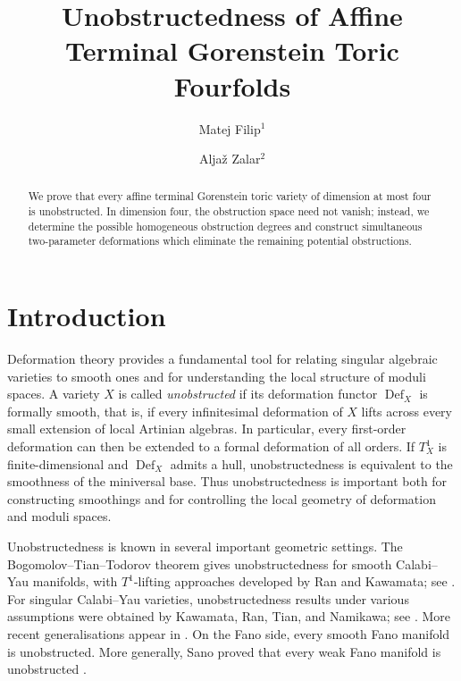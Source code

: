 \documentclass[11pt]{amsart}
\title{Unobstructedness of Affine Terminal Gorenstein Toric Fourfolds}
\author{Matej Filip${}^1$}
\author{Alja\v{z} Zalar${}^2$}
\numberwithin{equation}{section}
\theoremstyle{plain}
\theoremstyle{definition}
\newcommand{\0}{$0$-mutable}
\renewcommand{\1}{$1$-rigid}
\renewcommand{\0}{$0$-mutable}
\newcommand{\Def}{\operatorname{Def}}
\begin{document}
\begin{abstract}
We prove that every affine terminal Gorenstein toric variety of
dimension at most four is unobstructed. In dimension four, the
obstruction space need not vanish; instead, we determine the possible
homogeneous obstruction degrees and construct simultaneous
two-parameter deformations which eliminate the remaining potential
obstructions.
\end{abstract}

\maketitle





\section{Introduction}


Deformation theory provides a fundamental tool for relating singular
algebraic varieties to smooth ones and for understanding the local
structure of moduli spaces. A variety \(X\) is called
\emph{unobstructed} if its deformation functor \(\Def_X\) is formally
smooth, that is, if every infinitesimal deformation of \(X\) lifts
across every small extension of local Artinian algebras. In
particular, every first-order deformation can then be extended to a
formal deformation of all orders. If \(T_X^1\) is finite-dimensional
and \(\Def_X\) admits a hull, unobstructedness is equivalent to the
smoothness of the miniversal base. Thus unobstructedness is important
both for constructing smoothings and for controlling the local
geometry of deformation and moduli spaces.

Unobstructedness is known in several important geometric settings.
The Bogomolov--Tian--Todorov theorem gives unobstructedness for smooth
Calabi--Yau manifolds, with \(T^1\)-lifting approaches developed by
Ran and Kawamata; see \cite{Ran92b,Kaw92}. For singular Calabi--Yau
varieties, unobstructedness results under various assumptions were
obtained by Kawamata, Ran, Tian, and Namikawa; see
\cite{Kaw92,Ran92a,Tia92,Nam94}. More recent generalisations appear in \cite{FL24b,FL25b}. On the Fano side, every smooth Fano manifold is unobstructed. More generally, Sano proved that every weak Fano manifold is unobstructed \cite{San14}.
\end{document}

